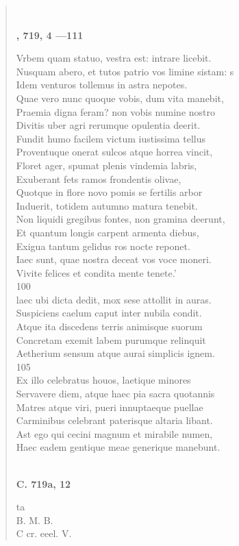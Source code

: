 \documentclass[11pt, a4paper]{report}
\begin{document}
\begin{verse}
        ﻿\pagebreak 
     \marginpar{[188]} \begin{center} \textbf{, 719, 4 —111} \end{center}Vrbem quam statuo, vestra est: intrare licebit. \\ Nusquam abero, et tutos patrio vos limine sistam: s \\ Idem venturos tollemus in astra nepotes. \\ Quae vero nunc quoque vobis, dum vita manebit, \\ Praemia digna feram? non vobis numine nostro \\ Divitis uber agri rerumque opulentia deerit. \\ Fundit humo facilem victum iustissima tellus \\ Proventuque onerat sulcos atque horrea vincit, \\ Floret ager, spumat plenis vindemia labris, \\ Exuberant fets ramos frondentis olivae, \\ Quotque in flore novo pomis se fertilis arbor \\ Induerit, totidem autumno matura tenebit. \\ Non liquidi gregibus fontes, non gramina deerunt, \\ Et quantum longis carpent armenta diebus, \\ Exigua tantum gelidus ros nocte reponet. \\ Iaec sunt, quae nostra deceat vos voce moneri. \\ Vivite felices et condita mente tenete.’ \\ 100 \\ laec ubi dicta dedit, mox sese attollit in auras. \\ Suspiciens caelum caput inter nubila condit. \\ Atque ita discedens terris animisque suorum \\ Concretam exemit labem purumque relinquit \\ Aetherium sensum atque aurai simplicis ignem. \\ 105 \\ Ex illo celebratus houos, laetique minores \\ Servavere diem, atque haec pia sacra quotannis \\ Matres atque viri, pueri innuptaeque puellae \\ Carminibus celebrant paterisque altaria libant. \\ Ast ego qui cecini magnum et mirabile numen, \\ Haec eadem gentique meae generique manebunt. \\ 
        ﻿\pagebreak 
    \begin{center} \textbf{C. 719a, 12} \end{center} \marginpar{[189]} ta \\ B. M. B. \\ C cr. eeel. V. \\ 
      \end{verse}
  
\end{document}
